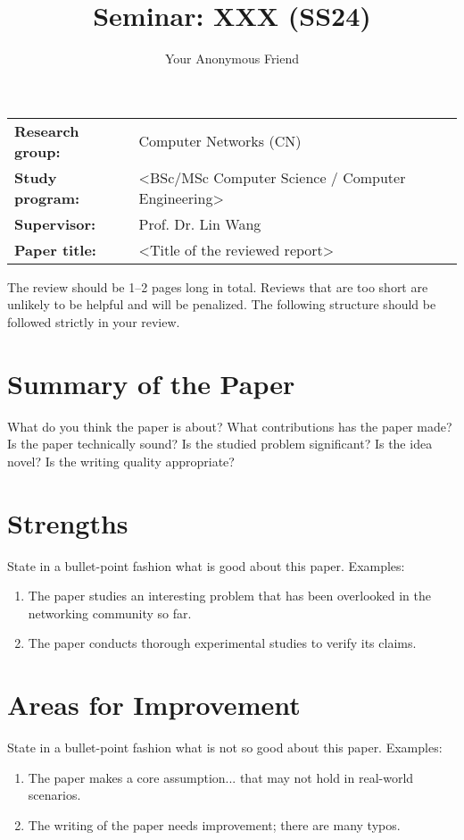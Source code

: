 \documentclass{template-core/upb-cn}
\title{Seminar: XXX (SS24)}
\author{Your Anonymous Friend}
\begin{document}
\makethetitle

\begin{notebox}
    \begin{tabular}{@{}ll}
        \textbf{Research group:} & Computer Networks (CN) \\
        \textbf{Study program:} & <BSc/MSc Computer Science / Computer Engineering> \\
        \textbf{Supervisor:} & Prof. Dr. Lin Wang \\
        \textbf{Paper title:} & <Title of the reviewed report>
    \end{tabular}
\end{notebox}

The review should be 1--2 pages long in total. Reviews that are too short are unlikely to be helpful and will be penalized. The following structure should be followed strictly in your review.

\section{Summary of the Paper}

What do you think the paper is about? What contributions has the paper made? Is the paper technically sound? Is the studied problem significant? Is the idea novel? Is the writing quality appropriate?


\section{Strengths}

State in a bullet-point fashion what is good about this paper. Examples:

\begin{enumerate}
    \item The paper studies an interesting problem that has been overlooked in the networking community so far.
    \item The paper conducts thorough experimental studies to verify its claims. 
\end{enumerate}

\section{Areas for Improvement}

State in a bullet-point fashion what is not so good about this paper. Examples:

\begin{enumerate}
    \item The paper makes a core assumption... that may not hold in real-world scenarios.
    \item The writing of the paper needs improvement; there are many typos.
\end{enumerate}
\end{document}
